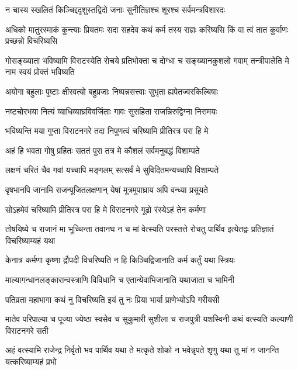 \twolineshloka
{न चास्य स्खलितं किञ्चिद्ददृशुस्तद्विदो जनाः}
{सुनीतिज्ञश्च शूरश्च सर्वमन्त्रविशारदः}


\threelineshloka
{अधिको मातुरस्माकं कुन्त्याः प्रियतमः सदा}
{सहदेव कथं कर्म तस्य राज्ञः करिष्यसि}
{किं वा त्वं तात कुर्वाणः प्रच्छन्नो विचरिष्यसि}




\threelineshloka
{गोसङ्ख्याता भविष्यामि विराटस्येति रोचये}
{प्रतिभोक्ता च दोग्धा च सङ्ख्यानकुशलो गवाम्}
{तन्त्रीपालेति मे नाम स्वयं प्रोक्तं भविष्यति}


\twolineshloka
{अयोगा बहुलाः पुष्टाः क्षीरवत्यो बहुप्रजाः}
{निष्पन्नसत्त्वाः सुभृता ह्यपेतज्वरकिल्बिषाः}


\twolineshloka
{नष्टचोरभया नित्यं व्याधिव्याघ्रविवर्जिताः}
{गावः सुसहिता राजन्निरुद्विग्ना निरामयः}


\twolineshloka
{भविष्यन्ति मया गुप्ता विराटनगरे तदा}
{निपुणत्वं चरिष्यामि प्रीतिरत्र परा हि मे}


\twolineshloka
{अहं हि भवता गोषु प्रहितः सततं पुरा}
{तत्र मे कौशलं सर्वमनुबद्धं विशाम्पते}


\twolineshloka
{लक्षणं चरितं चैव गवां यच्चापि मङ्गलम्}
{सत्सर्वं मे सुविदितमन्यच्चापि विशाम्पते}


\twolineshloka
{वृषभानपि जानामि राजन्पूजितलक्षणान्}
{येषां मूत्रमुपाघ्राय अपि वन्ध्या प्रसूयते}


\twolineshloka
{सोऽहमेवं चरिष्यामि प्रीतिरत्र परा हि मे}
{विराटनगरे गूढो रंस्येऽहं तेन कर्मणा}


\threelineshloka
{तोषयिष्ये च राजानं मा भूच्चिन्ता तवानघ}
{न च मां वेत्स्यति परस्तत्ते रोचतु पार्थिव}
{इत्येतद्वः प्रतिज्ञातं विचरिष्याम्यहं यथा}




\twolineshloka
{केनात्र कर्मणा कृष्णा द्रौपदी विचरिष्यति}
{न हि किञ्चिद्विजानाति कर्म कर्तुं यथा स्त्रियः}


\twolineshloka
{माल्यागन्धानलङ्कारान्वस्त्राणि विविधानि च}
{एतान्येवाभिजानाति यथाजाता च भामिनी}


\twolineshloka
{पतिव्रता महाभागा कथं नु विचरिष्यति}
{इयं तु नः प्रिया भार्या प्राणेभ्योऽपि गरीयसी}


\threelineshloka
{मातेव परिपाल्या च पूज्या ज्येष्ठा स्वसेव च}
{सुकुमारी सुशीला च राजपुत्री यशस्विनी}
{कथं वत्स्यति कल्याणी विराटनगरे सती}




\threelineshloka
{अहं वत्स्यामि राजेन्द्र निर्वृतो भव पार्थिव}
{यथा ते मत्कृते शोको न भवेन्नृपते शृणु}
{यथा तु मां न जानन्ति यत्करिष्याम्यहं प्रभो}


